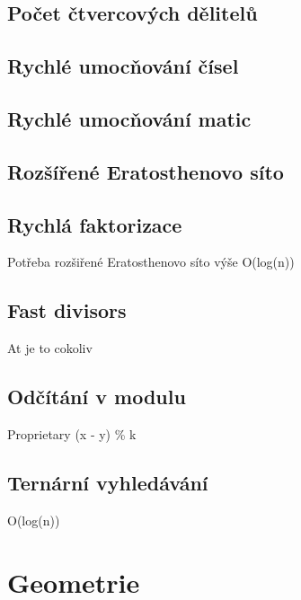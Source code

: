 \documentclass[10pt, a4paper, twoside]{article}
\begin{document}
\subsection{Počet čtvercových dělitelů}


\subsection{Rychlé umocňování čísel}



\subsection{Rychlé umocňování matic}


\subsection{Rozšířené Eratosthenovo síto}


\subsection{Rychlá faktorizace}
Potřeba rozšiřené Eratosthenovo síto výše
O(log(n))


\subsection{Fast divisors}
At je to cokoliv


\subsection{Odčítání v modulu}
Proprietary (x - y) \% k


\subsection{Ternární vyhledávání}
O(log(n))


\newpage

\section{Geometrie}

\end{document}
